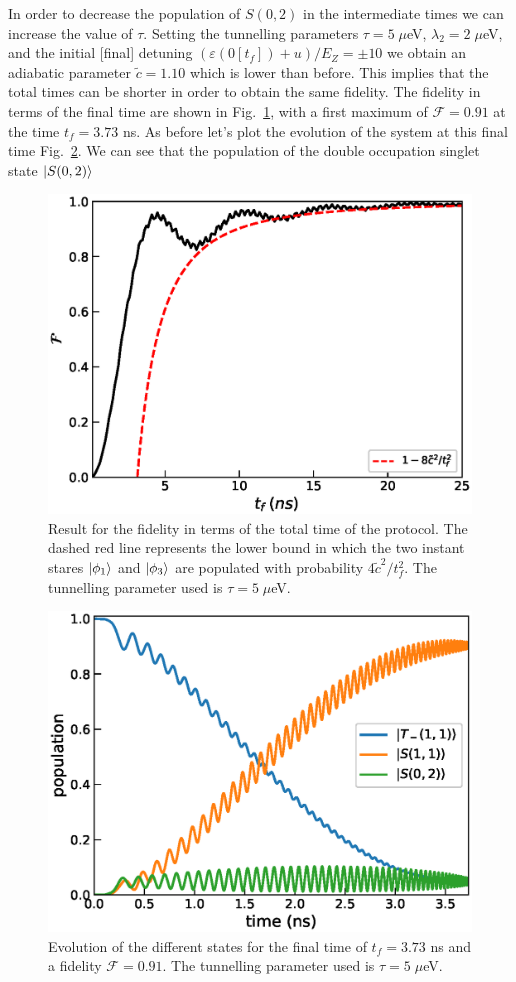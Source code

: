 \documentclass[a4paper,11pt]{article}
\begin{document}
In order to decrease the population of $S(0,2)$ in the intermediate times we can increase the value of $\tau$. Setting the tunnelling parameters $\tau=5 \; \mu$eV, $\lambda_2=2\;\mu$eV, and the initial [final] detuning $(\varepsilon(0[t_f])+u)/E_Z=\pm10$ we obtain an adiabatic parameter $\tilde{c}=1.10$ which is lower than before. This implies that the total times can be shorter in order to obtain the same fidelity. The fidelity in terms of the final time are shown in Fig.~\ref{fig:FAQUAD_2QD_Results_2}, with a first maximum of $\mathcal{F}=0.91$ at the time $t_f=3.73$ ns. As before let's plot the evolution of the system at this final time Fig.~\ref{fig:states_evolution_2}. We can see that the population of the double occupation singlet state $\ket{S(0,2)}$
\begin{figure}[!htbp]
	\centering
	\includegraphics[width=0.7\linewidth]{FAQUAD_2QD_Results_2.eps}
	\caption{Result for the fidelity in terms of the total time of the protocol. The dashed red line represents the lower bound in which the two instant stares $\ket{\phi_1}$ and $\ket{\phi_3}$ are populated with probability $4\tilde{c}^2/t_f^2$. The tunnelling parameter used is $\tau=5\; \mu$eV.}
	\label{fig:FAQUAD_2QD_Results_2}
\end{figure}
\begin{figure}[!htbp]
	\centering
	\includegraphics[width=0.7\linewidth]{states_evolution_2.eps}
	\caption{Evolution of the different states for the final time of $t_f=3.73$ ns and a fidelity $\mathcal{F}=0.91$. The tunnelling parameter used is $\tau=5\; \mu$eV.}
	\label{fig:states_evolution_2}
\end{figure}\\
\end{document}
